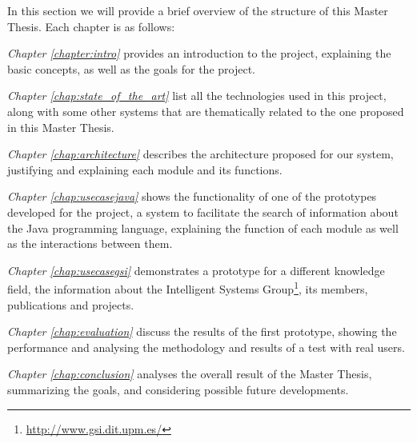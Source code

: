 In this section we will provide a brief overview of the structure of this Master Thesis. Each chapter is as follows:

\emph{Chapter \ref{chapter:intro}} provides an introduction to the project, explaining the basic concepts, as well as the goals for the project.

\emph{Chapter \ref{chap:state_of_the_art}} list all the technologies used in this project, along with some other systems that are thematically related to the one proposed in this Master Thesis.

\emph{Chapter \ref{chap:architecture}} describes the architecture proposed for our system, justifying and explaining each module and its functions.

\emph{Chapter \ref{chap:usecasejava}} shows the functionality of one of the prototypes developed for the project, a system to facilitate the search of information about the Java programming language, explaining the function of each module as well as the interactions between them.

\emph{Chapter \ref{chap:usecasegsi}} demonstrates a prototype for a different knowledge field, the information about the Intelligent Systems Group\footnote{\url{http://www.gsi.dit.upm.es/}}, its members, publications and projects. 

\emph{Chapter \ref{chap:evaluation}} discuss the results of the first prototype, showing the performance and analysing the methodology and results of a test with real users.

\emph{Chapter \ref{chap:conclusion}} analyses the overall result of the Master Thesis, summarizing the goals, and considering possible future developments.
